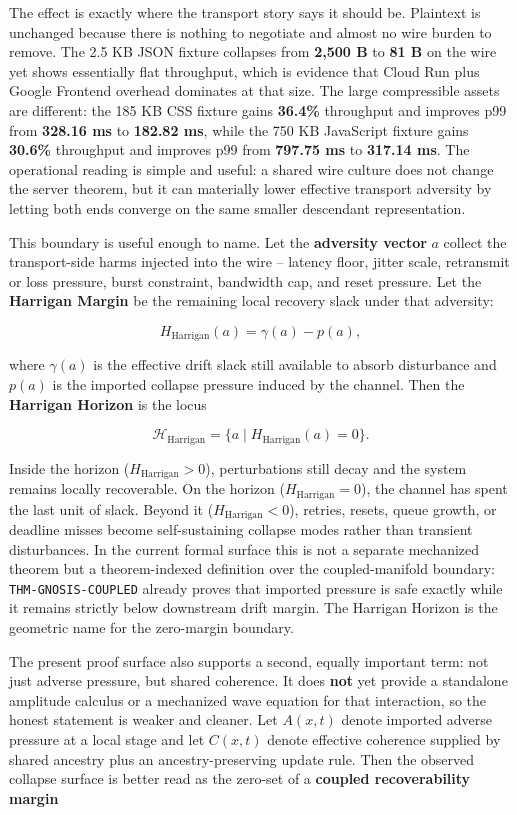 \documentclass[
  11pt,
]{article}
\begin{document}
The effect is exactly where the transport story says it should be.
Plaintext is unchanged because there is nothing to negotiate and almost
no wire burden to remove. The 2.5 KB JSON fixture collapses from
\textbf{2,500 B} to \textbf{81 B} on the wire yet shows essentially flat
throughput, which is evidence that Cloud Run plus Google Frontend
overhead dominates at that size. The large compressible assets are
different: the 185 KB CSS fixture gains \textbf{36.4\%} throughput and
improves p99 from \textbf{328.16 ms} to \textbf{182.82 ms}, while the
750 KB JavaScript fixture gains \textbf{30.6\%} throughput and improves
p99 from \textbf{797.75 ms} to \textbf{317.14 ms}. The operational
reading is simple and useful: a shared wire culture does not change the
server theorem, but it can materially lower effective transport
adversity by letting both ends converge on the same smaller descendant
representation.

This boundary is useful enough to name. Let the \textbf{adversity
vector} \(a\) collect the transport-side harms injected into the wire --
latency floor, jitter scale, retransmit or loss pressure, burst
constraint, bandwidth cap, and reset pressure. Let the \textbf{Harrigan
Margin} be the remaining local recovery slack under that adversity:

\[
H_{\mathrm{Harrigan}}(a) = \gamma(a) - p(a),
\]

where \(\gamma(a)\) is the effective drift slack still available to
absorb disturbance and \(p(a)\) is the imported collapse pressure
induced by the channel. Then the \textbf{Harrigan Horizon} is the locus

\[
\mathcal{H}_{\mathrm{Harrigan}} = \{ a \mid H_{\mathrm{Harrigan}}(a) = 0 \}.
\]

Inside the horizon (\(H_{\mathrm{Harrigan}} > 0\)), perturbations still
decay and the system remains locally recoverable. On the horizon
(\(H_{\mathrm{Harrigan}} = 0\)), the channel has spent the last unit of
slack. Beyond it (\(H_{\mathrm{Harrigan}} < 0\)), retries, resets, queue
growth, or deadline misses become self-sustaining collapse modes rather
than transient disturbances. In the current formal surface this is not a
separate mechanized theorem but a theorem-indexed definition over the
coupled-manifold boundary: \texttt{THM-GNOSIS-COUPLED} already proves
that imported pressure is safe exactly while it remains strictly below
downstream drift margin. The Harrigan Horizon is the geometric name for
the zero-margin boundary.

The present proof surface also supports a second, equally important
term: not just adverse pressure, but shared coherence. It does
\textbf{not} yet provide a standalone amplitude calculus or a mechanized
wave equation for that interaction, so the honest statement is weaker
and cleaner. Let \(A(x,t)\) denote imported adverse pressure at a local
stage and let \(C(x,t)\) denote effective coherence supplied by shared
ancestry plus an ancestry-preserving update rule. Then the observed
collapse surface is better read as the zero-set of a \textbf{coupled
recoverability margin}
\end{document}
